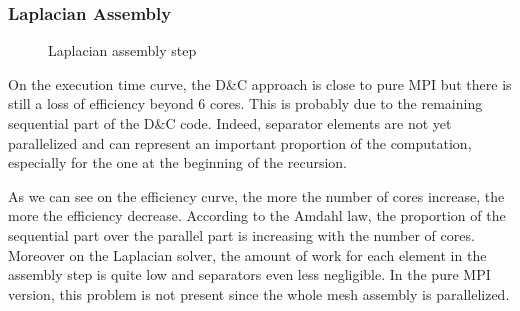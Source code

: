 \documentclass{IOS-Book-Article}
\begin{document}
\subsubsection{Laplacian Assembly}
\begin{figure}[htp]
 \centering
 \hspace{1em}%
 \caption{Laplacian assembly step}
\end{figure}
On the execution time curve, the D\&C approach is close to pure MPI but there is still a loss of efficiency beyond 6 cores.
This is probably due to the remaining sequential part of the D\&C code. Indeed, separator elements are not yet parallelized and can represent an important proportion
of the computation, especially for the one at the beginning of the recursion.

As we can see on the efficiency curve, the more the number of cores increase, the more the efficiency decrease. According to the Amdahl law,
the proportion of the sequential part over the parallel part is increasing with the number of cores. Moreover on the Laplacian solver, the amount of work for each
element in the assembly step is quite low and separators even less negligible. In the pure MPI version, this problem is not present since the whole mesh assembly is parallelized.
\end{document}
